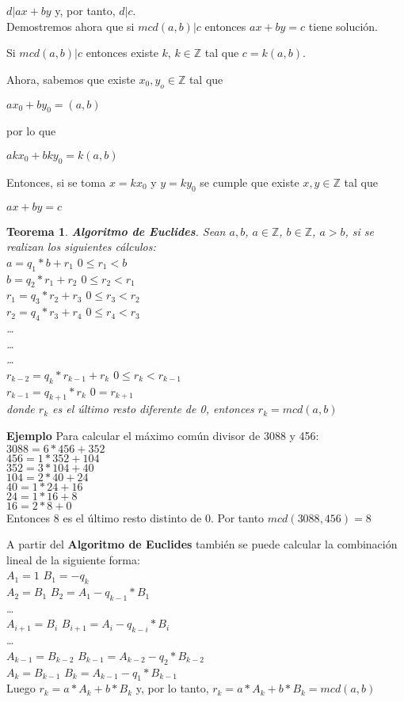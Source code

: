 \documentclass[a4paper,1pt]{report}
\newtheorem*{teo}{Teorema}
\begin{document}
$d|ax+by$ y, por tanto, $d|c$.
\\

Demostremos ahora que si $mcd(a,b)|c$ entonces $ax+by=c$ tiene solución.

Si $mcd(a,b)|c$ entonces existe $k,\, k\in\mathbb{Z}$ tal que $c=k(a,b)$.

Ahora, sabemos que existe $x_0,y_o\in\mathbb{Z}$ tal que

$ax_0+by_0=(a,b)$

por lo que

$akx_0+bky_0=k(a,b)$

Entonces, si se toma $x=kx_0$ y $y=ky_0$ se cumple que existe $x,y\in\mathbb{Z}$ tal que 

$ax+by=c$


\newpage
\begin{teo}
 \textbf{Algoritmo de Euclides}. Sean $a,b$, $a\in\mathbb{Z}$, $b\in\mathbb{Z}$, $a>b$, si se realizan los siguientes cálculos:\\
 $a=q_1*b+r_1$ $0\leq r_1<b$\\
 $b=q_2*r_1+r_2$  $0\leq r_2<r_1$\\
 $r_1=q_3*r_2+r_3$ $0\leq r_3<r_2$\\
 $r_2=q_4*r_3+r_4$ $0\leq r_4<r_3$\\
 \dots\\
 \dots\\
 \dots\\
 $r_{k-2}=q_k*r_{k-1}+r_k$ $0\leq r_k<r_{k-1}$\\
 $r_{k-1}=q_{k+1}*r_{k}$ $0=r_{k+1}$\\
 donde $r_k$ es el último resto diferente de 0, entonces $r_k=mcd(a,b)$
\end{teo}

\textbf{Ejemplo}
Para calcular el máximo común divisor de 3088 y 456:\\
$3088=6*456+352$\\
$456=1*352+104$\\
$352=3*104+40$\\
$104=2*40+24$\\
$40=1*24+16$\\
$24=1*16+8$\\
$16=2*8 + 0$\\
Entonces 8 es el último resto distinto de 0. Por tanto $mcd(3088,456)=8$

A partir del \textbf{Algoritmo de Euclides} también se puede calcular la combinación lineal de la siguiente forma:\\
$A_1=1$ $B_1=-q_k$\\
$A_2=B_1$ $B_2=A_1-q_{k-1}*B_1$\\
\dots\\
$A_{i+1}=B_i$ $B_{i+1}=A_i-q_{k-i}*B_i$\\
\dots\\
$A_{k-1}=B_{k-2}$ $B_{k-1}=A_{k-2}-q_2*B_{k-2}$\\
$A_{k}=B_{k-1}$ $B_{k}=A_{k-1}-q_1*B_{k-1}$\\
Luego $r_k=a*A_k+b*B_k$ y, por lo tanto, $r_k=a*A_k+b*B_k=mcd(a,b)$
\end{document}
